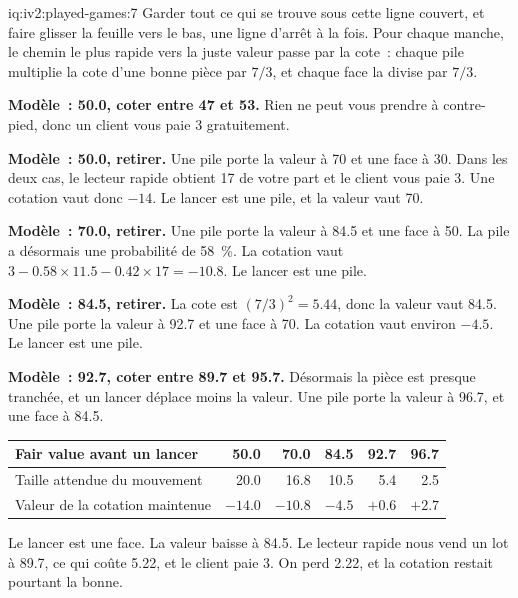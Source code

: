\begin{solution}{iq:iv2:played-games:7}
Garder tout ce qui se trouve sous cette ligne couvert, et faire glisser la feuille vers le bas, une ligne d'arrêt à la fois. Pour chaque manche, le chemin le plus rapide vers la juste valeur passe par la cote~: chaque pile multiplie la cote d'une bonne pièce par $7/3$, et chaque face la divise par $7/3$.

\ivstop
\textbf{Modèle~: 50.0, coter entre 47 et 53.} Rien ne peut vous prendre à contre-pied, donc un client vous paie 3 gratuitement.

\ivstop
\textbf{Modèle~: 50.0, retirer.} Une pile porte la valeur à 70 et une face à 30. Dans les deux cas, le lecteur rapide obtient 17 de votre part et le client vous paie 3. Une cotation vaut donc $-14$. Le lancer est une pile, et la valeur vaut 70.

\ivstop
\textbf{Modèle~: 70.0, retirer.} Une pile porte la valeur à 84.5 et une face à 50. La pile a désormais une probabilité de 58~\%. La cotation vaut $3 - 0.58 \times 11.5 - 0.42 \times 17 = -10.8$. Le lancer est une pile.

\ivstop
\textbf{Modèle~: 84.5, retirer.} La cote est $(7/3)^2 = 5.44$, donc la valeur vaut 84.5. Une pile porte la valeur à 92.7 et une face à 70. La cotation vaut environ $-4.5$. Le lancer est une pile.

\ivstop
\textbf{Modèle~: 92.7, coter entre 89.7 et 95.7.} Désormais la pièce est presque tranchée, et un lancer déplace moins la valeur. Une pile porte la valeur à 96.7, et une face à 84.5.
\begin{center}\small
\begin{tabular}{@{}l*{5}{r}@{}}
Fair value avant un lancer & 50.0 & 70.0 & 84.5 & 92.7 & 96.7 \\ \hline
Taille attendue du mouvement & 20.0 & 16.8 & 10.5 & 5.4 & 2.5 \\
Valeur de la cotation maintenue & $-14.0$ & $-10.8$ & $-4.5$ & $+0.6$ & $+2.7$
\end{tabular}
\end{center}
Le lancer est une face. La valeur baisse à 84.5. Le lecteur rapide nous vend un lot à 89.7, ce qui coûte 5.22, et le client paie 3. On perd 2.22, et la cotation restait pourtant la bonne.


\end{solution}
